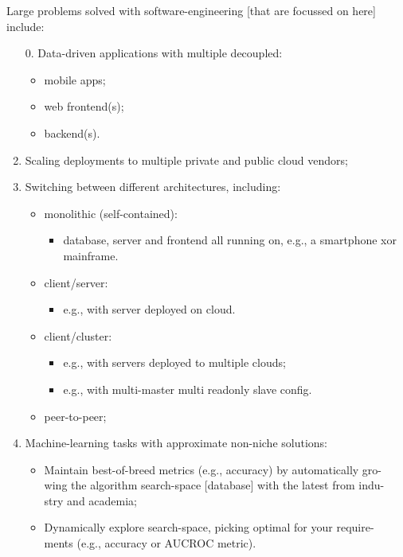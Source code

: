 Large problems solved with software-engineering [that are focussed on here] include:
\begin{enumerate}
    \item[0.] Data-driven applications with multiple decoupled:
    \begin{itemize}
        \item mobile apps;
        \item web frontend(s);
        \item backend(s).
    \end{itemize}
    \item Scaling deployments to multiple private and public cloud vendors;
    \item Switching between different architectures, including:
    \begin{itemize}
        \item monolithic (self-contained):
        \begin{itemize}
            \item database, server and frontend all running on, e.g., a smartphone xor mainframe.
        \end{itemize}
        \item client/server:
        \begin{itemize}
            \item e.g., with server deployed on cloud.
        \end{itemize}
        \item client/cluster:
        \begin{itemize}
            \item e.g., with servers deployed to multiple clouds;
            \item e.g., with multi-master multi readonly slave config.
        \end{itemize}
        \item peer-to-peer;
    \end{itemize}
    \item Machine-learning tasks with approximate non-niche solutions:
    \begin{itemize}
        \item Maintain best-of-breed metrics (e.g., accuracy) by automatically gro-\\wing the algorithm search-space [database] with the latest from indu-\\stry and academia;
        \item Dynamically explore search-space, picking optimal for your require-\\ments (e.g., accuracy or AUCROC metric).
    \end{itemize}
\end{enumerate}

